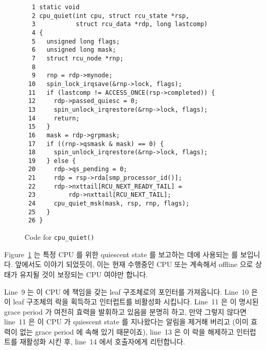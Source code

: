 \begin{figure}[tbp]
{ \scriptsize
\begin{verbatim}
  1 static void
  2 cpu_quiet(int cpu, struct rcu_state *rsp,
  3           struct rcu_data *rdp, long lastcomp)
  4 {
  5   unsigned long flags;
  6   unsigned long mask;
  7   struct rcu_node *rnp;
  8
  9   rnp = rdp->mynode;
 10   spin_lock_irqsave(&rnp->lock, flags);
 11   if (lastcomp != ACCESS_ONCE(rsp->completed)) {
 12     rdp->passed_quiesc = 0;
 13     spin_unlock_irqrestore(&rnp->lock, flags);
 14     return;
 15   }
 16   mask = rdp->grpmask;
 17   if ((rnp->qsmask & mask) == 0) {
 18     spin_unlock_irqrestore(&rnp->lock, flags);
 19   } else {
 20     rdp->qs_pending = 0;
 21     rdp = rsp->rda[smp_processor_id()];
 22     rdp->nxttail[RCU_NEXT_READY_TAIL] =
 23         rdp->nxttail[RCU_NEXT_TAIL];
 24     cpu_quiet_msk(mask, rsp, rnp, flags);
 25   }
 26 }
\end{verbatim}
}
\caption{Code for {\tt cpu\_quiet()}}
\label{fig:app:rcuimpl:rcutreewt:Code for cpu-quiet}
\end{figure}

Figure~\ref{fig:app:rcuimpl:rcutreewt:Code for cpu-quiet}
는 특정 CPU 를 위한 quiescent state 를 보고하는 데에 사용되는 
를 보입니다.
앞에서도 이야기 되었듯이, 이는 현재 수행중인 CPU 또는 계속해서 offline 으로
상태가 유지될 것이 보장되는 CPU 여야만 합니다.

Line~9 는 이 CPU 에 책임을 갖는 leaf  구조체로의 포인터를
가져옵니다.
Line~10 은 이 leaf  구조체의 락을 획득하고 인터럽트를 비활성화
시킵니다.
Line~11 은 이 명시된 grace period 가 여전히 효력을 발휘하고 있음을 분명히 하고,
만약 그렇지 않다면 line~11 은 이 CPU 가 quiescent state 를 지나왔다는 알림을
제거해 버리고 (이미 효력이 없는 grace period 에 속해 있기 때문이죠), line~13 은
이 락을 해제하고 인터럽트를 재활성화 시킨 후, line~14 에서 호출자에게
리턴합니다.
\iffalse

Figure~\ref{fig:app:rcuimpl:rcutreewt:Code for cpu-quiet}
shows \co{cpu_quiet}, which is used to report a quiescent state
for the specified CPU.
As noted earlier, this must either be the currently running CPU
or a CPU that is guaranteed to remain offline throughout.

Line~9 picks up a pointer to the leaf \co{rcu_node} structure
responsible for this CPU.
Line~10 acquires this leaf \co{rcu_node} structure's lock and
disables interrupts.
Line~11 checks to make sure that the specified grace period is
still in effect, and, if not, line~11 clears the indication that
this CPU passed through a quiescent state (since it belongs to
a defunct grace period), line~13 releases the lock and re-enables
interrupts, and line~14 returns to the caller.
\fi

